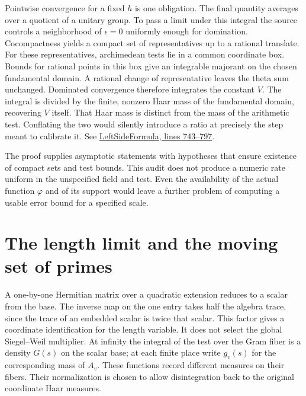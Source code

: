\documentclass[12pt,letterpaper]{article}
\begin{document}
Pointwise convergence for a fixed $h$ is one obligation. The final quantity averages over a quotient of a unitary group. To pass a limit under this integral the source controls a neighborhood of $\epsilon=0$ uniformly enough for domination. Cocompactness yields a compact set of representatives up to a rational translate. For these representatives, archimedean tests lie in a common coordinate box. Bounds for rational points in this box give an integrable majorant on the chosen fundamental domain. A rational change of representative leaves the theta sum unchanged. Dominated convergence therefore integrates the constant $V$. The integral is divided by the finite, nonzero Haar mass of the fundamental domain, recovering $V$ itself. That Haar mass is distinct from the mass of the arithmetic test. Conflating the two would silently introduce a ratio at precisely the step meant to calibrate it. See \href{https://github.com/nousentllc/riemann-hypothesis/blob/40e56bab026552e089d7afcfeff08d2defb9c005/src/Development/AutomorphicSpectrum/Proofs/BlockDecomposition/LeftSideFormula.lean#L743-L797}{LeftSideFormula, lines 743--797}.

The proof supplies asymptotic statements with hypotheses that ensure existence of compact sets and test bounds. This audit does not produce a numeric rate uniform in the unspecified field and test. Even the availability of the actual function $\varphi$ and of its support would leave a further problem of computing a usable error bound for a specified scale.

\section{The length limit and the moving set of primes}

A one-by-one Hermitian matrix over a quadratic extension reduces to a scalar from the base. The inverse map on the one entry takes half the algebra trace, since the trace of an embedded scalar is twice that scalar. This factor gives a coordinate identification for the length variable. It does not select the global Siegel--Weil multiplier. At infinity the integral of the test over the Gram fiber is a density $G(s)$ on the scalar base; at each finite place write $g_v(s)$ for the corresponding mass of $A_v$. These functions record different measures on their fibers. Their normalization is chosen to allow disintegration back to the original coordinate Haar measures.
\end{document}
